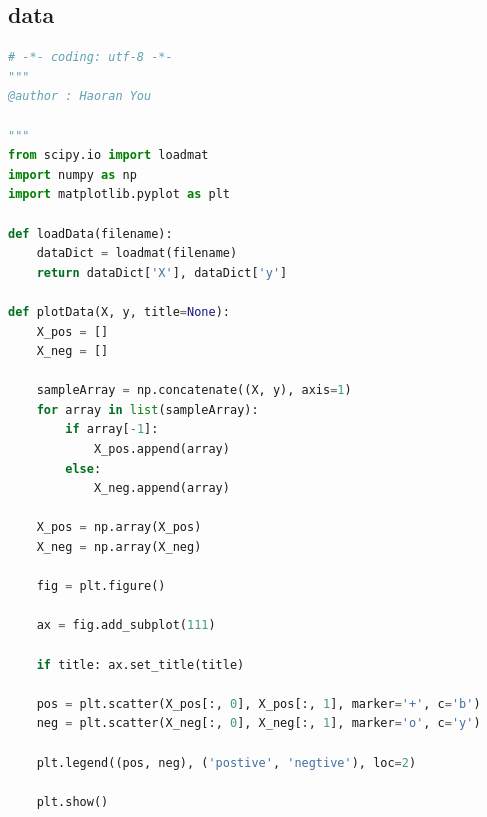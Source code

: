 \documentclass[UTF-8, a4paper, 10pt]{article}
\numberwithin{equation}{section}
\begin{document}
\subsection{data}
\begin{lstlisting}[language=python]
# -*- coding: utf-8 -*-
"""
@author : Haoran You

"""
from scipy.io import loadmat
import numpy as np
import matplotlib.pyplot as plt

def loadData(filename):
    dataDict = loadmat(filename)
    return dataDict['X'], dataDict['y']

def plotData(X, y, title=None):
    X_pos = []
    X_neg = []

    sampleArray = np.concatenate((X, y), axis=1)
    for array in list(sampleArray):
        if array[-1]:
            X_pos.append(array)
        else:
            X_neg.append(array)

    X_pos = np.array(X_pos)
    X_neg = np.array(X_neg)

    fig = plt.figure()

    ax = fig.add_subplot(111)

    if title: ax.set_title(title)

    pos = plt.scatter(X_pos[:, 0], X_pos[:, 1], marker='+', c='b')
    neg = plt.scatter(X_neg[:, 0], X_neg[:, 1], marker='o', c='y')

    plt.legend((pos, neg), ('postive', 'negtive'), loc=2)

    plt.show()

\end{lstlisting}
\newpage
\end{document}
